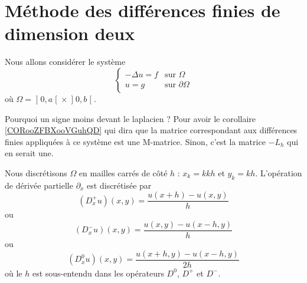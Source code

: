 \section{Méthode des différences finies de dimension deux}

Nous allons considérer le système
\begin{equation}                \label{SYSooTANLooRgnIMp}
     \begin{cases}
         -\Delta u=f    &   \text{sur } \Omega\\
         u=g            &   \text{sur } \partial\Omega
     \end{cases}
\end{equation}
où \( \Omega=\mathopen] 0 , a \mathclose[\times \mathopen] 0 , b \mathclose[\).

\begin{remark}
    Pourquoi un signe moins devant le laplacien ? Pour avoir le corollaire \ref{CORooZFBXooVGuhQD} qui dira que la matrice correspondant aux différences finies appliquées à ce système est une M-matrice. Sinon, c'est la matrice \(-L_h\) qui en serait une.
\end{remark}

Nous discrétisons \( \Omega\) en mailles carrés de côté \( h\) : \( x_k=kkh\) et \( y_k=kh\). L'opération de dérivée partielle \( \partial_x\) est discrétisée par
\begin{equation}
    (D_x^+u)(x,y)=\frac{ u(x+h)-u(x,y) }{ h }
\end{equation}
ou
\begin{equation}
    (D_x^-u)(x,y)=\frac{ u(x,y)-u(x-h,y) }{ h }
\end{equation}
ou
\begin{equation}
    (D^0_xu)(x,y)=\frac{ u(x+h,y)-u(x-h,y) }{ 2h }
\end{equation}
où le \( h\) est sous-entendu dans les opérateurs \( D^0\), \( D^+\) et \( D^-\).

